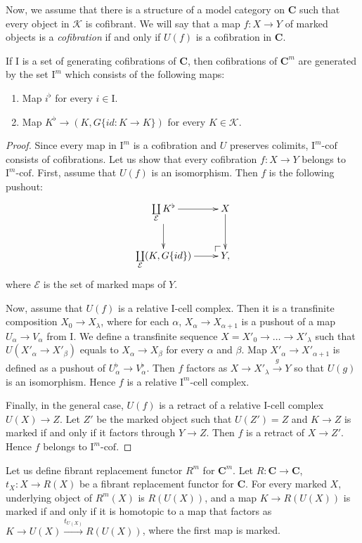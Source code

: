 \documentclass[reqno]{amsart}
\makeatletter
\theoremstyle{definition}
\theoremstyle{remark}
\newcommand{\cat}[1]{\mathbf{#1}}
\newcommand{\C}{\cat{C}}
\newcommand{\I}{\mathrm{I}}
\newcommand{\class}[2]{#1\text{-}\mathrm{#2}}
\newcommand{\Icell}[1][\I]{\class{#1}{cell}}
\newcommand{\Icof}[1][\I]{\class{#1}{cof}}
\numberwithin{figure}{section}
\newcommand{\po}[1][dr]{\save*!/#1+1.2pc/#1:(1,-1)@^{|-}\restore}
\makeatother
\begin{document}
Now, we assume that there is a structure of a model category on $\C$ such that every object in $\mathcal{K}$ is cofibrant.
We will say that a map $f : X \to Y$ of marked objects is a \emph{cofibration} if and only if $U(f)$ is a cofibration in $\C$. 
\begin{prop}
If $\I$ is a set of generating cofibrations of $\C$, then cofibrations of $\C^m$ are generated by the set $\I^m$ which consists of the following maps:
\begin{enumerate}
\item Map $i^\flat$ for every $i \in \I$.
\item Map $K^\flat \to (K, G \{ id : K \to K \})$ for every $K \in \mathcal{K}$.
\end{enumerate}
\end{prop}
\begin{proof}
Since every map in $\I^m$ is a cofibration and $U$ preserves colimits, $\Icof[\I^m]$ consists of cofibrations.
Let us show that every cofibration $f : X \to Y$ belongs to $\Icof[\I^m]$.
First, assume that $U(f)$ is an isomorphism.
Then $f$ is the following pushout:
\[ \xymatrix{ \coprod\limits_\mathcal{E} K^\flat \ar[r] \ar[d] & X \ar[d] \\
              \coprod\limits_\mathcal{E} (K, G \{id\}) \ar[r] & \po Y,
            } \]
where $\mathcal{E}$ is the set of marked maps of $Y$.

Now, assume that $U(f)$ is a relative $\Icell$ complex.
Then it is a transfinite composition $X_0 \to X_\lambda$, where for each $\alpha$, $X_\alpha \to X_{\alpha+1}$ is a pushout of a map $U_\alpha \to V_\alpha$ from $\I$.
We define a transfinite sequence $X = X'_0 \to \ldots \to X'_\lambda$ such that $U(X'_\alpha \to X'_\beta)$ equals to $X_\alpha \to X_\beta$ for every $\alpha$ and $\beta$.
Map $X'_\alpha \to X'_{\alpha+1}$ is defined as a pushout of $U^\flat_\alpha \to V^\flat_\alpha$.
Then $f$ factors as $X \to X'_\lambda \xrightarrow{g} Y$ so that $U(g)$ is an isomorphism.
Hence $f$ is a relative $\Icell[\I^m]$ complex.

Finally, in the general case, $U(f)$ is a retract of a relative $\Icell$ complex $U(X) \to Z$.
Let $Z'$ be the marked object such that $U(Z') = Z$ and $K \to Z$ is marked if and only if it factors through $Y \to Z$.
Then $f$ is a retract of $X \to Z'$.
Hence $f$ belongs to $\Icof[\I^m]$.
\end{proof}

Let us define fibrant replacement functor $R^m$ for $\C^m$.
Let $R : \C \to \C$, $t_X : X \to R(X)$ be a fibrant replacement functor for $\C$.
For every marked $X$, underlying object of $R^m(X)$ is $R(U(X))$, and a map $K \to R(U(X))$ is marked if and only if
it is homotopic to a map that factors as $K \to U(X) \xrightarrow{t_{U(X)}} R(U(X))$, where the first map is marked.
\end{document}
